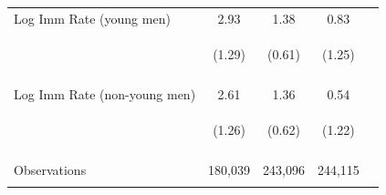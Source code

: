 \begin{center}
\begin{tabular}{lcccc}
\noalign{\smallskip}Log Imm Rate (young men) & 2.93 & 1.38 & 0.83 & \\
 & \begin{footnotesize}(1.29)\end{footnotesize} & \begin{footnotesize}(0.61)\end{footnotesize} & \begin{footnotesize}(1.25)\end{footnotesize} & \begin{footnotesize}\end{footnotesize}\\
 & \begin{footnotesize}[0.025]\end{footnotesize} & \begin{footnotesize}[0.026]\end{footnotesize} & \begin{footnotesize}[0.508]\end{footnotesize} & \begin{footnotesize}\end{footnotesize}\\
\noalign{\smallskip}Log Imm Rate (non-young men) & 2.61 & 1.36 & 0.54 & \\
 & \begin{footnotesize}(1.26)\end{footnotesize} & \begin{footnotesize}(0.62)\end{footnotesize} & \begin{footnotesize}(1.22)\end{footnotesize} & \begin{footnotesize}\end{footnotesize}\\
 & \begin{footnotesize}[0.041]\end{footnotesize} & \begin{footnotesize}[0.031]\end{footnotesize} & \begin{footnotesize}[0.658]\end{footnotesize} & \begin{footnotesize}\end{footnotesize}\\
\noalign{\smallskip}Observations & 180,039 & 243,096 & 244,115 & \\
 & \begin{footnotesize}\end{footnotesize} & \begin{footnotesize}\end{footnotesize} & \begin{footnotesize}\end{footnotesize} & \begin{footnotesize}\end{footnotesize}\\

\end{tabular}
\end{center}
